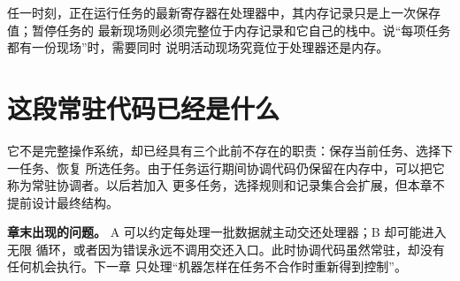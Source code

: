 任一时刻，正在运行任务的最新寄存器在处理器中，其内存记录只是上一次保存值；暂停任务的
最新现场则必须完整位于内存记录和它自己的栈中。说“每项任务都有一份现场”时，需要同时
说明活动现场究竟位于处理器还是内存。

\section{这段常驻代码已经是什么}

它不是完整操作系统，却已经具有三个此前不存在的职责：保存当前任务、选择下一任务、恢复
所选任务。由于任务运行期间协调代码仍保留在内存中，可以把它称为常驻协调者。以后若加入
更多任务，选择规则和记录集合会扩展，但本章不提前设计最终结构。

\begin{problemframe}
\textbf{章末出现的问题。} A 可以约定每处理一批数据就主动交还处理器；B 却可能进入无限
循环，或者因为错误永远不调用交还入口。此时协调代码虽然常驻，却没有任何机会执行。下一章
只处理“机器怎样在任务不合作时重新得到控制”。
\end{problemframe}
